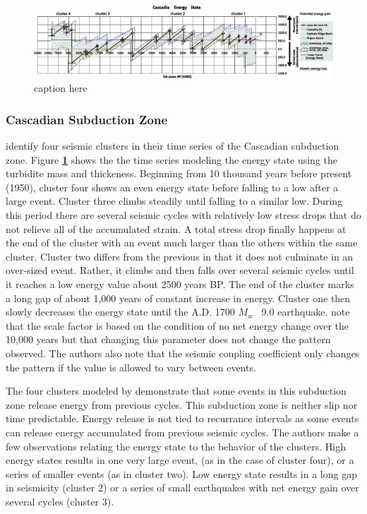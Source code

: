 \documentclass[draft,jgrga]{agutex}
\begin{document}
\begin{article}
\begin{figure}
	\includegraphics[width=1\linewidth]{./Figures/Goldfinger/F4large.jpg}
	\caption{caption here}
	\label{fig:energyCycle}
\end{figure}

\subsubsection{Cascadian Subduction Zone}

 \citet{Goldfinger2013} identify four seismic clusters in their time series of the Cascadian subduction zone. Figure {\bf \ref{fig:energyCycle}} shows the the time series modeling the energy state using the turbidite mass and thickeness. Beginning from 10 thousand years before present (1950), cluster four shows an even energy state before falling to a low after a large event. Cluster three climbs steadily until falling to a similar low. During this period there are several seismic cycles with relatively low stress drops that do not relieve all of the accumulated strain. A total stress drop finally happens at the end of the cluster with an event much larger than the others within the same cluster. Cluster two differs from the previous in that it does not culminate in an over-sized event. Rather, it climbs and then falls over several seismic cycles until it reaches a low energy value about 2500 years BP. The end of the cluster marks a long gap of about 1,000 years of constant increase in energy. Cluster one then slowly decreases the energy state until the A.D. 1700 $M_w$ ~9.0 earthquake. \citep{Goldfinger2013} note that the scale factor is based on the condition of no net energy change over the 10,000 years but that changing this parameter does not change the pattern observed. The authors also note that the seismic coupling coefficient only changes the pattern if the value is allowed to vary between events. 

The four clusters modeled by \citet{Goldfinger2013} demonstrate that some events in this subduction zone release energy from previous cycles. This subduction zone is neither slip nor time predictable. Energy release is not tied to recurrance intervals as some events can release energy accumulated from previous seismic cycles. The authors make a few observations relating the energy state to the behavior of the clusters. High energy states results in one very large event, (as in the case of cluster four), or a series of smaller events (as in cluster two). Low energy state results in a long gap in seismicity (cluster 2) or a series of small earthquakes with net energy gain over several cycles (cluster 3). 


\end{article}
\end{document}
